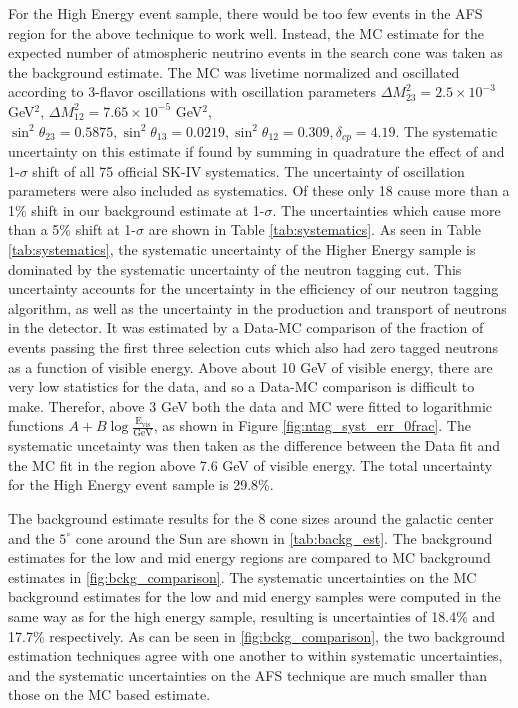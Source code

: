 For the High Energy event sample, there would be too few events in the AFS region for the above technique to work well.  Instead, the MC estimate for the expected number of atmospheric neutrino events in the search cone was taken as the background estimate.  The MC was livetime normalized and oscillated according to 3-flavor oscillations with oscillation parameters $\Delta M_{23}^2=2.5 \times 10^{-3}$ GeV$^2$, $\Delta M_{12}^2=7.65 \times 10^{-5}$ GeV$^2$, $\sin^2 \theta_{23}=0.5875, \sin^2 \theta_{13}=0.0219, \sin^2 \theta_12=0.309, \delta_{cp}=4.19$.   The systematic uncertainty on this estimate if found by summing in quadrature the effect of and 1-$\sigma$ shift of all 75 official SK-IV systematics.  The uncertainty of oscillation parameters were also included as systematics. Of these only 18 cause more than a 1\% shift in our background estimate at 1-$\sigma$.  The uncertainties which cause more than a 5\% shift at 1-$\sigma$ are shown in Table \ref{tab:systematics}.   As seen in Table \ref{tab:systematics}, the systematic uncertainty of the Higher Energy sample is dominated by the systematic uncertainty of the neutron tagging cut.  This uncertainty accounts for the uncertainty in the efficiency of our neutron tagging algorithm, as well as the uncertainty in the production and transport of neutrons in the detector.  It was estimated by a Data-MC comparison of the fraction of events passing the first three selection cuts which also had zero tagged neutrons as a function of visible energy.  Above about 10 GeV of visible energy, there are very low statistics for the data, and so a Data-MC comparison is difficult to make.  Therefor, above 3 GeV both the data and MC were fitted to logarithmic functions $A+B\log \frac{\textrm{E}_\textrm{vis}}{\textrm{GeV}}$, as shown in Figure \ref{fig:ntag_syst_err_0frac}.  The systematic uncetainty was then taken as the difference between the Data fit and the MC fit in the region above 7.6 GeV of visible energy.  The total uncertainty for the High Energy event sample is 29.8\%.    

The background estimate results for the 8 cone sizes around the galactic center and the $5^\circ$ cone around the Sun are shown in \cref{tab:backg_est}.  The background estimates for the low and mid energy regions are compared to MC background estimates in \cref{fig:bckg_comparison}.  The systematic uncertainties on the MC background estimates for the low and mid energy samples were computed in the same way as for the high energy sample, resulting is uncertainties of 18.4\% and 17.7\% respectively.  As can be seen in \cref{fig:bckg_comparison}, the two background estimation techniques agree with one another to within systematic uncertainties, and the systematic uncertainties on the AFS technique are much smaller than those on the MC based estimate. 


